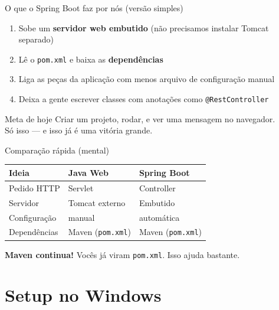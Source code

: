 \documentclass[aspectratio=169,11pt]{beamer}
\begin{document}
\begin{frame}{O que o Spring Boot faz por nós (versão simples)}
  \begin{enumerate}
    \item Sobe um \textbf{servidor web embutido} (não precisamos instalar Tomcat separado)
    \item Lê o \texttt{pom.xml} e baixa as \textbf{dependências}
    \item Liga as peças da aplicação com menos arquivo de configuração manual
    \item Deixa a gente escrever classes com anotações como \texttt{@RestController}
  \end{enumerate}

  \vspace{0.8em}
  \begin{block}{Meta de hoje}
    Criar um projeto, rodar, e ver uma mensagem no navegador.\\
    Só isso --- e isso já é uma vitória grande.
  \end{block}
\end{frame}

\begin{frame}{Comparação rápida (mental)}
  \begin{center}
  \begin{tabular}{lll}
    \toprule
    Ideia & Java Web & Spring Boot \\
    \midrule
    Pedido HTTP & Servlet & Controller \\
    Servidor & Tomcat externo & Embutido \\
    Configuração & manual & automática \\
    Dependências & Maven (\texttt{pom.xml}) & Maven (\texttt{pom.xml}) \\
    \bottomrule
  \end{tabular}
  \end{center}

  \vspace{1em}
  \textbf{Maven continua!} Vocês já viram \texttt{pom.xml}. Isso ajuda bastante.
\end{frame}

\section{Setup no Windows}
\end{document}
